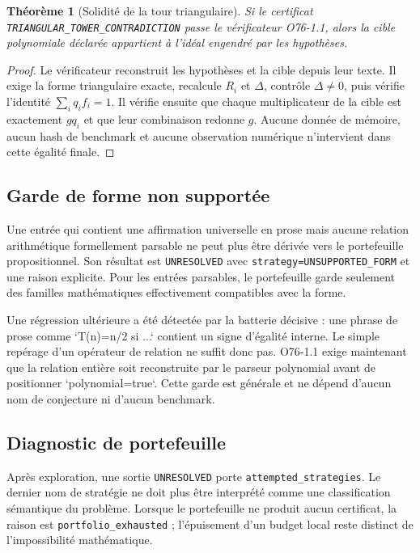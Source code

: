 \documentclass[11pt,a4paper]{article}
\newtheorem{theorem}{Théorème}[section]
\begin{document}
\begin{theorem}[Solidité de la tour triangulaire]
Si le certificat \texttt{TRIANGULAR\_TOWER\_CONTRADICTION} passe le vérificateur O76-1.1, alors la cible polynomiale déclarée appartient à l'idéal engendré par les hypothèses.
\end{theorem}
\begin{proof}
Le vérificateur reconstruit les hypothèses et la cible depuis leur texte. Il exige la forme triangulaire exacte, recalcule $R_i$ et $\Delta$, contrôle $\Delta\ne0$, puis vérifie l'identité $\sum_i q_i f_i=1$. Il vérifie ensuite que chaque multiplicateur de la cible est exactement $gq_i$ et que leur combinaison redonne $g$. Aucune donnée de mémoire, aucun hash de benchmark et aucune observation numérique n'intervient dans cette égalité finale.
\end{proof}

\subsection{Garde de forme non supportée}
Une entrée qui contient une affirmation universelle en prose mais aucune relation arithmétique formellement parsable ne peut plus être dérivée vers le portefeuille propositionnel. Son résultat est \texttt{UNRESOLVED} avec \texttt{strategy=UNSUPPORTED\_FORM} et une raison explicite. Pour les entrées parsables, le portefeuille garde seulement des familles mathématiques effectivement compatibles avec la forme.

Une régression ultérieure a été détectée par la batterie décisive : une phrase de prose comme `T(n)=n/2 si ...` contient un signe d'égalité interne. Le simple repérage d'un opérateur de relation ne suffit donc pas. O76-1.1 exige maintenant que la relation entière soit reconstruite par le parseur polynomial avant de positionner `polynomial=true`. Cette garde est générale et ne dépend d'aucun nom de conjecture ni d'aucun benchmark.

\subsection{Diagnostic de portefeuille}
Après exploration, une sortie \texttt{UNRESOLVED} porte \texttt{attempted\_strategies}. Le dernier nom de stratégie ne doit plus être interprété comme une classification sémantique du problème. Lorsque le portefeuille ne produit aucun certificat, la raison est \texttt{portfolio\_exhausted} ; l'épuisement d'un budget local reste distinct de l'impossibilité mathématique.
\end{document}
